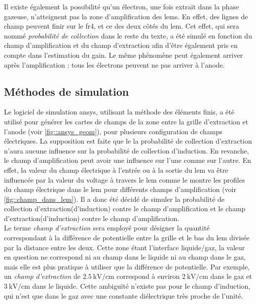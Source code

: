         Il existe également la possibilité qu'un électron, une fois extrait dans la phase gazeuse, n'atteignent pas la zone d'amplification des \glspl{lem}. En effet, des lignes de champ peuvent finir sur le \gls{fr4}, et ce des deux côtés du \gls{lem}. Cet effet, qui sera nommé \textit{probabilité de collection} dans le reste du texte, a été simulé en fonction du champ d'amplification et du champ d'extraction afin d'être également pris en compte dans l'estimation du gain. Le même phénomène peut également arriver après l'amplification : tous les électrons peuvent ne pas arriver à l'anode.
        
        \subsection{Méthodes de simulation}
        
            Le logiciel de simulation \gls{ansys}, utilisant la méthode des éléments finis, a été utilisé pour générer les cartes de champs de la zone entre la grille d'extraction et l'anode (voir \autoref{fig::ansys_geom}), pour plusieurs configuration de champs électriques. La supposition est faite que le la probabilité de collection d'extraction n'aura aucune influence sur la probabilité de collection d'induction. En revanche, le champ d'amplification peut avoir une influence sur l'une comme sur l'autre. En effet, la valeur du champ électrique à l'entrée ou à la sortie du \gls{lem} va être influencée par la valeur du voltage à travers le \gls{lem} comme le montre les profiles du champ électrique dans le \gls{lem} pour différents champs d'amplification (voir \autoref{fig::champ_dans_lem}). Il a donc été décidé de simuler la probabilité de collection d'extraction(d'induction) contre le champ d'amplification et le champ d'extraction(d'induction) contre le champ d'amplification.\\
            
            Le terme \textit{champ d'extraction} sera employé pour désigner la quantité correspondant à la différence de potentielle entre la grille et le bas du \gls{lem} divisée par la distance entre les deux. Cette zone étant l'interface liquide/gaz, la valeur en question ne correspond ni au champ dans le liquide ni au champ dans le gaz, mais elle est plus pratique à utiliser que la différence de potentielle. Par exemple, un \textit{champ d'extraction} de $\SI{2.5}{\kilo\volt\per\centi\meter}$ correspond à environ $\SI{2}{\kilo\volt\per\centi\meter}$ dans le gaz et $\SI{3}{\kilo\volt\per\centi\meter}$ dans le liquide. Cette ambiguïté n'existe pas pour le champ d'induction, qui n'est que dans le gaz avec une constante diélectrique très proche de l'unité.\\
            
